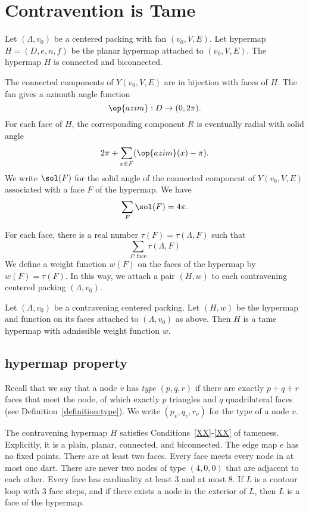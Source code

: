 \section{Contravention is Tame}
    \label{sec:contraproof}

Let $(\Lambda,v_0)$ be a centered packing with
fan $(v_0,V,E)$.  Let  hypermap $H=(D,e,n,f)$
be the planar hypermap attached to $(v_0,V,E)$.
The hypermap $H$ is connected and biconnected.

The connected components of $Y(v_0,V,E)$ are in bijection with
faces of $H$.  
The fan gives a azimuth angle function
$$
\op{azim} : D \to (0,2\pi).
$$
For each face of $H$, the corresponding component $R$
is eventually radial with solid
angle
  $$
  2\pi + \sum_{x\in F} (\op{azim}(x) -\pi).
  $$
We write $\sol(F)$ for the solid angle of the connected component
of $Y(v_0,V,E)$ associated with a face $F$ of the hypermap.
We have
    $$\sum_{F} \sol(F) = 4\pi.$$


For each face, there is a
real number $\tau(F)=\tau(\Lambda,F)$ such that
$$
  \sum_{F : \text{face}}\tau(\Lambda,F)
$$
We define a weight function $w(F)$ on the faces of the hypermap
by $w(F) = \tau(F)$.  In this way, we attach
a pair $(H,w)$ to each contravening centered packing $(\Lambda,v_0)$.


\begin{theorem} \label{theorem:contravene}
Let $(\Lambda,v_0)$ be a contravening centered packing.  Let $(H,w)$ be
the hypermap and function on its faces attached to $(\Lambda,v_0)$ as above.
Then $H$ is a tame hypermap with admissible weight function $w$.
\end{theorem}




\subsection{hypermap property}
    \label{sec:startame}


Recall that we say that a node $v$ has {\it type\/} $(p,q,r)$ if
there are exactly $p+q+r$ faces that meet the node, of which exactly
$p$ triangles and $q$ quadrilateral faces (see
Definition~\ref{definition:type}).  We write $(p_v,q_v,r_v)$ for the
type of a node $v$.

\begin{lemma} The contravening hypermap $H$ satisfies Conditions~\ref{XX}-\ref{XX} 
of tameness.
Explicitly, it is a plain, planar, connected, and biconnected. 
The edge map $e$
has no fixed points. There are at least two faces. Every face meets
every node in at most one dart.  There are never two nodes of type
$(4,0,0)$ that are adjacent to each other.  Every face has
cardinality at least $3$ and at most $8$.  If $L$ is a contour loop
with $3$ face steps, and if there exists a node in the exterior of
$L$, then $L$ is a face of the hypermap.
\end{lemma}

